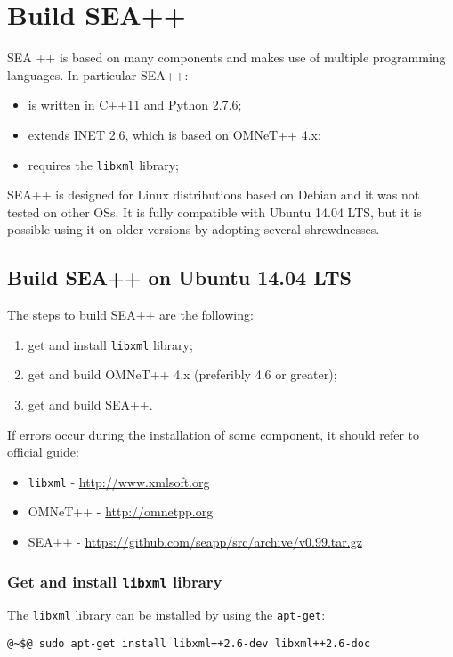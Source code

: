 


\chapter{Build SEA++}
\label{ch:build-seapp}

SEA ++ is based on many components and makes use of multiple programming languages.
In particular SEA++:
%
\begin{itemize}
\item is written in C++11 and Python 2.7.6;
\item extends INET 2.6, which is based on OMNeT++ 4.x;
\item requires the \texttt{libxml} library;
\end{itemize}

SEA++ is designed for Linux distributions based on Debian and it was not tested on other OSs.
It is fully compatible with Ubuntu 14.04 LTS, but it is possible using it on older versions by adopting several shrewdnesses.


\section{Build SEA++ on Ubuntu 14.04 LTS}
The steps to build SEA++ are the following:
%
\begin{enumerate}
\item get and install \texttt{libxml} library;
\item get and build OMNeT++ 4.x (preferibly 4.6 or greater);
\item get and build SEA++.
\end{enumerate}
%
 If errors occur during the installation of some component, it should refer to official guide:
%
\begin{itemize}
\item \texttt{libxml} - \url{http://www.xmlsoft.org}
\item OMNeT++ - \url{http://omnetpp.org}
\item SEA++ - \url{https://github.com/seapp/src/archive/v0.99.tar.gz}
\end{itemize}



\subsection{Get and install \texttt{libxml} library}
The \texttt{libxml} library can be installed by using the \texttt{apt-get}:
%
\begin{lstlisting}[language={terminal}]
@~$@ sudo apt-get install libxml++2.6-dev libxml++2.6-doc
\end{lstlisting}

